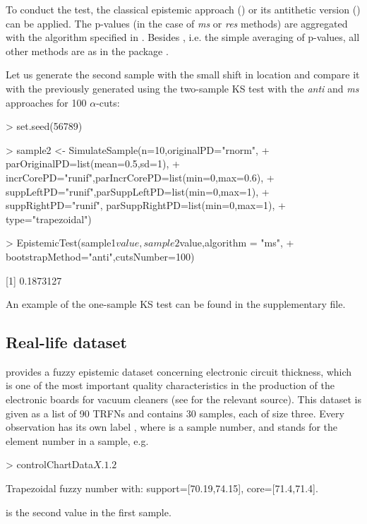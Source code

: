 To conduct the test, the classical epistemic approach () or its antithetic version () can be applied.
The p-values (in the case of \emph{ms} or \emph{res} methods) are aggregated with the algorithm specified in .
Besides , i.e. the simple averaging of p-values, all other methods are as in the package  \citep{palassoArt}.

Let us generate the second sample with the small shift in location and compare it with the previously generated  using the two-sample KS test with the \emph{anti} and \emph{ms} approaches for 100 $\alpha$-cuts:
\begin{example}
> set.seed(56789)

> sample2 <- SimulateSample(n=10,originalPD="rnorm",
+  parOriginalPD=list(mean=0.5,sd=1),
+  incrCorePD="runif",parIncrCorePD=list(min=0,max=0.6),
+  suppLeftPD="runif",parSuppLeftPD=list(min=0,max=1),
+  suppRightPD="runif", parSuppRightPD=list(min=0,max=1),
+  type="trapezoidal")

> EpistemicTest(sample1$value,sample2$value,algorithm = "ms",
+  bootstrapMethod="anti",cutsNumber=100)

[1] 0.1873127
\end{example}
An example of the one-sample KS test can be found in the supplementary file. 




\subsection{Real-life dataset}


 provides a fuzzy epistemic dataset  concerning electronic circuit thickness, which is one of the most important quality characteristics in the production of the electronic boards for vacuum cleaners (see \cite{FARAZ20102684} for the relevant source).
This dataset is given as a list of 90 TRFNs and contains 30 samples, each of size three.
Every observation has its own label , where  is a sample number, and  stands for the element number in a sample, e.g.
\begin{example}
> controlChartData$X.1.2$

Trapezoidal fuzzy number with:
   support=[70.19,74.15],
      core=[71.4,71.4].
\end{example}
is the second value in the first sample.
 

